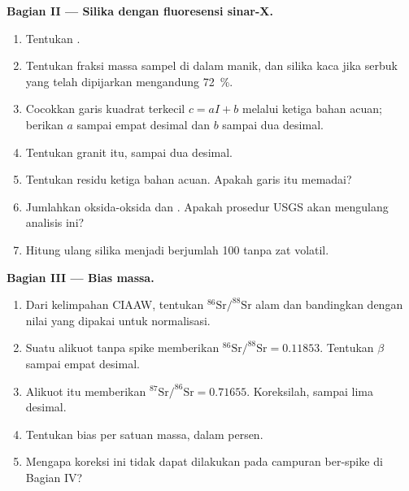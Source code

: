 \begin{problem}
\noindent\textbf{Bagian II --- Silika dengan fluoresensi sinar-X.}
\begin{enumerate}[resume]
  \item Tentukan .
  \item Tentukan fraksi massa sampel di dalam manik, dan silika kaca jika
        serbuk yang telah dipijarkan mengandung \qty{72}{\percent}.
  \item Cocokkan garis kuadrat terkecil $c = aI + b$ melalui ketiga bahan acuan; berikan $a$ sampai
        empat desimal dan $b$ sampai dua desimal.
  \item Tentukan  granit itu, sampai dua desimal.
  \item Tentukan residu ketiga bahan acuan. Apakah garis itu memadai?
  \item Jumlahkan oksida-oksida dan . Apakah prosedur USGS akan mengulang analisis ini?
  \item Hitung ulang silika menjadi berjumlah 100 tanpa zat volatil.
\end{enumerate}

\noindent\textbf{Bagian III --- Bias massa.}
\begin{enumerate}[resume]
  \item Dari kelimpahan CIAAW, tentukan $^{86}\mathrm{Sr}/^{88}\mathrm{Sr}$ alam dan bandingkan
        dengan nilai yang dipakai untuk normalisasi.
  \item Suatu alikuot tanpa spike memberikan $^{86}\mathrm{Sr}/^{88}\mathrm{Sr} = 0.11853$. Tentukan $\beta$ sampai
        empat desimal.
  \item Alikuot itu memberikan $^{87}\mathrm{Sr}/^{86}\mathrm{Sr} = 0.71655$. Koreksilah, sampai lima desimal.
  \item Tentukan bias per satuan massa, dalam persen.
  \item Mengapa koreksi ini tidak dapat dilakukan pada campuran ber-spike di Bagian IV?
\end{enumerate}


\end{problem}
